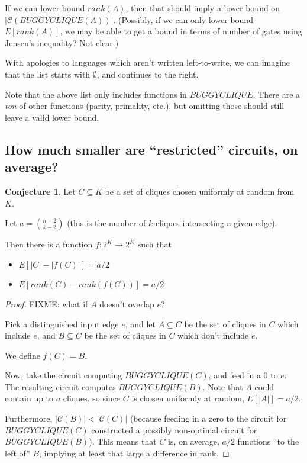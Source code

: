 \documentclass[12pt]{article}
\theoremstyle{definition}
\newtheorem{conj}{Conjecture}[section]
\newcommand{\bigC}[0]{\mathcal{C}}
\begin{document}
If we can lower-bound $rank(A)$, then that should imply a
lower bound on $|\bigC(BUGGYCLIQUE(A))|$. (Possibly, if we
can only lower-bound $E[rank(A)]$, we may be able to get
a bound in terms of number of gates using Jensen's inequality?
Not clear.)

With apologies to languages which aren't written left-to-write,
we can imagine that the list starts with $\emptyset$, and
continues to the right.

Note that the above list only includes functions in $BUGGYCLIQUE$.
There are a {\em ton} of other functions (parity, primality, etc.), but omitting
those should still leave a valid lower bound.

\subsection{How much smaller are ``restricted'' circuits, on average?}


\begin{conj}
\label{vaguelyUpward}
Let $C \subseteq K$ be a set of cliques chosen uniformly at random
from $K$.

Let $a = {n-2 \choose k-2}$ (this is the number of $k$-cliques
intersecting a given edge).

Then there is a function $f: 2^K \rightarrow 2^K$ such that
\begin{itemize}

\item $E[|C| - |f(C)|] = a/2$

\item $E[rank(C) - rank(f(C))] = a/2$

\end{itemize}

\end{conj}
\begin{proof}

FIXME: what if $A$ doesn't overlap $e$?

Pick a distinguished input edge $e$, and let $A \subseteq C$ be
the set of cliques in $C$ which include $e$, and $B \subseteq C$ be
the set of cliques in $C$ which don't include $e$.

We define $f(C) = B$.

Now, take the circuit computing $BUGGYCLIQUE(C)$, and
feed in a 0 to $e$. The resulting circuit computes
$BUGGYCLIQUE(B)$. Note that $A$ could contain up to $a$
cliques, so since $C$ is chosen uniformly at random,
$E[|A|] = a/2$.

Furthermore, $|\bigC(B)| < |\bigC(C)|$ (because feeding in
a zero to the circuit for $BUGGYCLIQUE(C)$ constructed a
possibly non-optimal circuit for $BUGGYCLIQUE(B)$).
 This means that
$C$ is, on average, $a/2$ functions ``to the left of'' $B$,
implying at least that large a difference in rank.

\end{proof}
\end{document}
